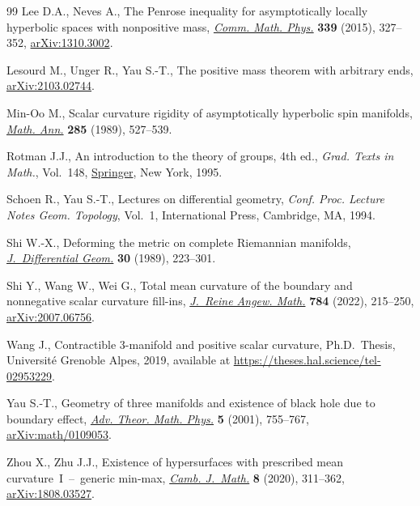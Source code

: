 \begin{thebibliography}{99}
Lee D.A., Neves A., The {P}enrose inequality for asymptotically locally
  hyperbolic spaces with nonpositive mass, \href{https://doi.org/10.1007/s00220-015-2421-x}{\textit{Comm. Math. Phys.}}
  \textbf{339} (2015), 327--352, \href{https://arxiv.org/abs/1310.3002}{arXiv:1310.3002}.

Lesourd M., Unger R., Yau S.-T., The positive mass theorem with arbitrary ends,
  \href{https://arxiv.org/abs/2103.02744}{arXiv:2103.02744}.

Min-Oo M., Scalar curvature rigidity of asymptotically hyperbolic spin
  manifolds, \href{https://doi.org/10.1007/BF01452046}{\textit{Math. Ann.}} \textbf{285} (1989), 527--539.

Rotman J.J., An introduction to the theory of groups, 4th ed., \textit{Grad. Texts in
  Math.}, Vol.~148, \href{https://doi.org/10.1007/978-1-4612-4176-8}{Springer}, New York, 1995.

Schoen R., Yau S.-T., Lectures on differential geometry, \textit{Conf. Proc.
  Lecture Notes Geom. Topology}, Vol.~1, International Press, Cambridge, MA,
  1994.

Shi W.-X., Deforming the metric on complete {R}iemannian manifolds,
  \href{https://doi.org/10.4310/jdg/1214443292}{\textit{J.~Differential Geom.}} \textbf{30} (1989), 223--301.

Shi Y., Wang W., Wei G., Total mean curvature of the boundary and nonnegative
  scalar curvature fill-ins, \href{https://doi.org/10.1515/crelle-2021-0072}{\textit{J.~Reine Angew. Math.}} \textbf{784}
  (2022), 215--250, \href{https://arxiv.org/abs/2007.06756}{arXiv:2007.06756}.

Wang J., Contractible 3-manifold and positive scalar curvature, Ph.D.~Thesis,
  {U}niversit{\'e} {G}renoble {A}lpes, 2019, available at
  \url{https://theses.hal.science/tel-02953229}.

Yau S.-T., Geometry of three manifolds and existence of black hole due to
  boundary effect, \href{https://doi.org/10.4310/ATMP.2001.v5.n4.a4}{\textit{Adv. Theor. Math. Phys.}} \textbf{5} (2001),
  755--767, \href{https://arxiv.org/abs/math/0109053}{arXiv:math/0109053}.

Zhou X., Zhu J.J., Existence of hypersurfaces with prescribed mean
  curvature~{I}~--~generic min-max, \href{https://doi.org/10.4310/CJM.2020.v8.n2.a2}{\textit{Camb. J.~Math.}} \textbf{8} (2020),
  311--362, \href{https://arxiv.org/abs/1808.03527}{arXiv:1808.03527}.


\end{thebibliography}
